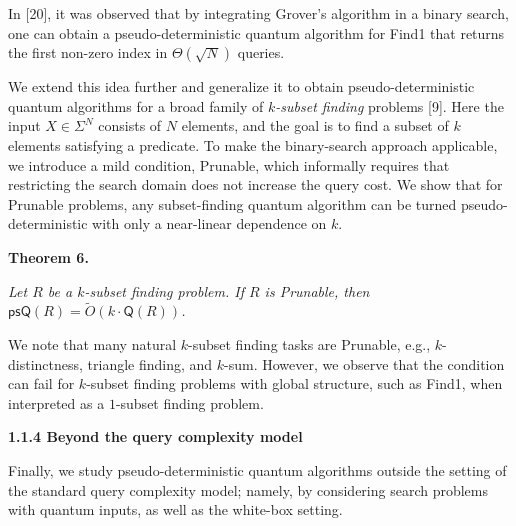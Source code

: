 In [20], it was observed that by integrating Grover’s algorithm in a binary search, one can obtain a pseudo-deterministic quantum algorithm for Find1 that returns the first non-zero index in $\Theta(\sqrt{N})$ queries.\par




We extend this idea further and generalize it to obtain pseudo-deterministic quantum algorithms for a broad family of \emph{$k$-subset finding} problems [9]. Here the input $X\in\Sigma^{N}$ consists of $N$ elements, and the goal is to find a subset of $k$ elements satisfying a predicate. To make the binary-search approach applicable, we introduce a mild condition, Prunable, which informally requires that restricting the search domain does not increase the query cost. We show that for Prunable problems, any subset-finding quantum algorithm can be turned pseudo-deterministic with only a near-linear dependence on $k$.\par





\par\medskip\noindent\textbf{
\textbf{Theorem 6}\textbf{.}
}\par



\emph{Let ${R}$ be a $k$-subset finding problem. If ${R}$ is Prunable, then $\mathsf{psQ}({R})=\tilde{O}(k\cdot\mathsf{Q}({R}))$.}\par






We note that many natural $k$-subset finding tasks are Prunable, e.g., $k$-distinctness, triangle finding, and $k$-sum. However, we observe that the condition can fail for $k$-subset finding problems with global structure, such as Find1, when interpreted as a $1$-subset finding problem.\par





\par\medskip\noindent\textbf{
1.1.4 Beyond the query complexity model}\par




Finally, we study pseudo-deterministic quantum algorithms outside the setting of the standard query complexity model; namely, by considering search problems with quantum inputs, as well as the white-box setting.\par




